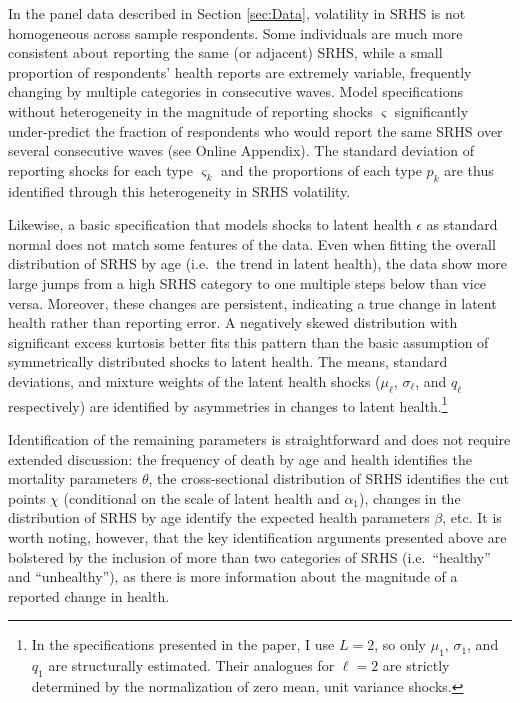\documentclass[12pt,pdftex,letterpaper]{article}
\newcommand{\Cut}{\chi}
\newcommand{\MortParam}{\theta}
\newcommand{\HealthParam}{\beta}
\newcommand{\LatentParam}{\alpha}
\newcommand{\HealthShock}{\epsilon}
\newcommand{\ShockMean}{\mu}
\newcommand{\ShockStd}{\sigma}
\newcommand{\MixProb}{q}
\newcommand{\TypeProb}{p}
\newcommand{\ReportStd}{\varsigma}
\begin{document}
In the panel data described in Section \ref{sec:Data}, volatility in SRHS is not homogeneous across sample respondents. Some individuals are much more consistent about reporting the same (or adjacent) SRHS, while a small proportion of respondents' health reports are extremely variable, frequently changing by multiple categories in consecutive waves. Model specifications without heterogeneity in the magnitude of reporting shocks $\ReportStd$ significantly under-predict the fraction of respondents who would report the same SRHS over several consecutive waves (see Online Appendix). The standard deviation of reporting shocks for each type $\ReportStd_k$ and the proportions of each type $\TypeProb_k$ are thus identified through this heterogeneity in SRHS volatility.

Likewise, a basic specification that models shocks to latent health $\HealthShock$ as standard normal does not match some features of the data. Even when fitting the overall distribution of SRHS by age (i.e.\ the trend in latent health), the data show more large jumps from a high SRHS category to one multiple steps below than vice versa. Moreover, these changes are persistent, indicating a true change in latent health rather than reporting error. A negatively skewed distribution with significant excess kurtosis better fits this pattern than the basic assumption of symmetrically distributed shocks to latent health. The means, standard deviations, and mixture weights of the latent health shocks ($\ShockMean_\ell$, $\ShockStd_\ell$, and $\MixProb_\ell$ respectively) are identified by asymmetries in changes to latent health.\footnote{In the specifications presented in the paper, I use $L=2$, so only $\ShockMean_1$, $\ShockStd_1$, and $\MixProb_1$ are structurally estimated. Their analogues for $\ell=2$ are strictly determined by the normalization of zero mean, unit variance shocks.} 

Identification of the remaining parameters is straightforward and does not require extended discussion: the frequency of death by age and health identifies the mortality parameters $\MortParam$, the cross-sectional distribution of SRHS identifies the cut points $\Cut$ (conditional on the scale of latent health and $\LatentParam_1$), changes in the distribution of SRHS by age identify the expected health parameters $\HealthParam$, etc.  It is worth noting, however, that the key identification arguments presented above are bolstered by the inclusion of more than two categories of SRHS (i.e.\ ``healthy'' and ``unhealthy''), as there is more information about the magnitude of a reported change in health.
\end{document}
